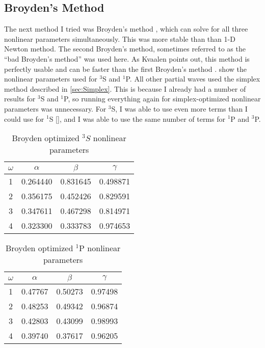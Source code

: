 \documentclass[Dissertation.tex]{subfiles}
\begin{document}
\subsection{Broyden's Method}
\label{sec:Broyden}
The next method I tried was Broyden's method \cite{Sauer2006}, which can solve for all three nonlinear parameters simultaneously. This was more stable than than 1-D Newton method. The second Broyden's method, sometimes referred to as the ``bad Broyden's method'' was used here. As Kvaalen points out, this method is perfectly usable and can be faster than the first Broyden's method \cite{Kvaalen1991}.  show the nonlinear parameters used for $^3$S and $^1$P. All other partial waves used the simplex method described in \cref{sec:Simplex}. This is because I already had a number of results for $^3$S and $^1$P, so running everything again for simplex-optimized nonlinear parameters was unnecessary. For $^3$S, I was able to use even more terms than I could use for $^1$S \cref{}, and I was able to use the same number of terms for $^1$P and $^3$P.

\setlength{\abovecaptionskip}{6pt}   %
\setlength{\belowcaptionskip}{6pt}   %
\begin{table}[H]
\centering
\begin{tabular}{c c c c}
\toprule
$\omega$ & $\alpha$ & $\beta$ & $\gamma$ \\ [0.5ex]
\midrule
1 & 0.264440 & 0.831645 & 0.498871 \\
2 & 0.356175 & 0.452426 & 0.829591 \\
3 & 0.347611 & 0.467298 & 0.814971 \\
4 & 0.323300 & 0.333783 & 0.974653 \\
\bottomrule
\end{tabular}
\caption{Broyden optimized $^3S$ nonlinear parameters}
\label{table:NonlinearOptimized3SBroyden}
\end{table}


\begin{table}[H]
\centering
\begin{tabular}{c c c c}
\toprule
$\omega$ & $\alpha$ & $\beta$ & $\gamma$ \\ [0.5ex]
\midrule
1 & 0.47767 & 0.50273 & 0.97498 \\
2 & 0.48253 & 0.49342 & 0.96874 \\
3 & 0.42803 & 0.43099 & 0.98993 \\
4 & 0.39740 & 0.37617 & 0.96205 \\
\bottomrule
\end{tabular}
\caption{Broyden optimized $^1$P nonlinear parameters}
\label{tab:BroydenPWaveSingOpt}
\end{table}
\end{document}
